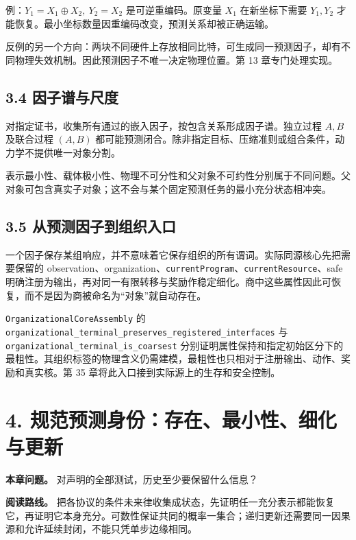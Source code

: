 \documentclass[
  11pt,
  oneside]{book}
\begin{document}
例：\(Y_1=X_1\oplus X_2,\ Y_2=X_2\) 是可逆重编码。原变量 \(X_1\) 在新坐标下需要 \(Y_1,Y_2\) 才能恢复。最小坐标数量因重编码改变，预测关系却被正确运输。

反例的另一个方向：两块不同硬件上存放相同比特，可生成同一预测因子，却有不同物理失效机制。因此预测因子不唯一决定物理位置。第 13 章专门处理实现。

\section{3.4 因子谱与尺度}\label{ux56e0ux5b50ux8c31ux4e0eux5c3aux5ea6}

对指定证书，收集所有通过的嵌入因子，按包含关系形成因子谱。独立过程 \(A,B\) 及联合过程 \((A,B)\) 都可能预测闭合。除非指定目标、压缩准则或组合条件，动力学不提供唯一对象分割。

表示最小性、载体极小性、物理不可分性和父对象不可约性分别属于不同问题。父对象可包含真实子对象；这不会与某个固定预测任务的最小充分状态相冲突。

\section{3.5 从预测因子到组织入口}\label{ux4eceux9884ux6d4bux56e0ux5b50ux5230ux7ec4ux7ec7ux5165ux53e3}

一个因子保存某组响应，并不意味着它保存组织的所有谓词。实际同源核心先把需要保留的 observation、organization、\nolinkurl{currentProgram}、\nolinkurl{currentResource}、safe 明确注册为输出，再对同一有限转移与奖励作稳定细化。商中这些属性因此可恢复，而不是因为商被命名为``对象''就自动存在。

\nolinkurl{OrganizationalCoreAssembly} 的 \nolinkurl{organizational_terminal_preserves_registered_interfaces} 与 \nolinkurl{organizational_terminal_is_coarsest} 分别证明属性保持和指定初始区分下的最粗性。其组织标签的物理含义仍需建模，最粗性也只相对于注册输出、动作、奖励和真实核。第 35 章将此入口接到实际源上的生存和安全控制。

\chapter{4. 规范预测身份：存在、最小性、细化与更新}\label{ch-4}

\textbf{本章问题。} 对声明的全部测试，历史至少要保留什么信息？

\textbf{阅读路线。} 把各协议的条件未来律收集成状态，先证明任一充分表示都能恢复它，再证明它本身充分。可数性保证共同的概率一集合；递归更新还需要同一因果源和允许延续封闭，不能只凭单步边缘相同。
\end{document}
